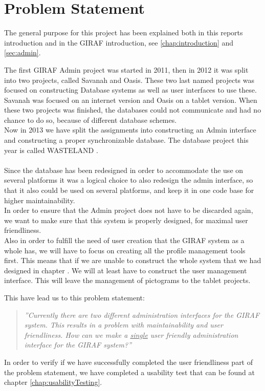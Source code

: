 \chapter{Problem Statement}
The general purpose for this project has been explained both in this reports introduction and in the GIRAF introduction, see \ref{chap:introduction} and \ref{sec:admin}.

The first GIRAF Admin project was started in 2011, then in 2012 it was split into two projects, called Savanah and Oasis. These two last named projects was focused on constructing Database systems as well as user interfaces to use these. Savanah was focused on an internet version and Oasis on a tablet version. When these two projects was finished, the databases could not communicate and had no chance to do so, because of different database schemes.\\
Now in 2013 we have split the assignments into constructing an Admin interface and constructing a proper synchronizable database. The database project this year is called WASTELAND \citep{wasteland}.\\
\\
Since the database has been redesigned in order to accommodate the use on several platforms it was a logical choice to also redesign the admin interface, so that it also could be used on several platforms, and keep it in one code base for higher maintainability.\\
In order to ensure that the Admin project does not have to be discarded again, we want to make sure that this system is properly designed, for maximal user friendliness.\\
Also in order to fulfill the need of user creation that the GIRAF system as a whole has, we will have to focus on creating all the profile management tools first. This means that if we are unable to construct the whole system that we had designed in chapter . We will at least have to construct the user management interface. This will leave the management of pictograms to the tablet projects.

This have lead us to this problem statement:
\begin{verse}
\textit{''Currently there are two different administration interfaces for the GIRAF system.
This results in a problem with maintainability and user friendliness.
How can we make a \underline{single} user friendly administration interface for the GIRAF system?''}
\end{verse}

In order to verify if we have successfully completed the user friendliness part of the problem statement, we have completed a usability test that can be found at chapter \vref{chap:usabilityTesting}.
